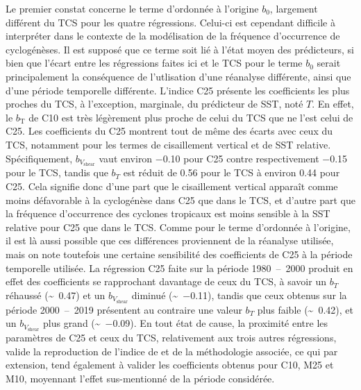 \documentclass[../main.tex]{subfiles}
\begin{document}
Le premier constat concerne le terme d'ordonnée à l'origine $b_0$, largement différent du TCS pour les quatre régressions. Celui-ci est cependant difficile à
interpréter dans le contexte de la modélisation de la fréquence d'occurrence de cyclogénèses. Il est supposé que ce terme soit lié à l'état moyen des
prédicteurs, si bien que l'écart entre les régressions faites ici et le TCS pour le terme $b_0$ serait principalement la conséquence de l'utlisation d'une
réanalyse différente, ainsi que d'une période temporelle différente. L'indice C25 présente les coefficients les plus proches du TCS, à l'exception, marginale,
du prédicteur de SST, noté $T$. En effet, le $b_{\mathrm{T}}$ de C10 est très légèrement plus proche de celui du TCS que ne l'est celui de C25. Les coefficients
du C25 montrent tout de même des écarts avec ceux du TCS, notamment pour les termes de cisaillement vertical et de SST relative. Spécifiquement,
$b_{V_{\mathrm{shear}}}$ vaut environ \num{-0.10} pour C25 contre respectivement \num{-0.15} pour le TCS, tandis que $b_T$ est réduit de \num{0.56} pour le TCS
à environ \num{0.44} pour C25. Cela signifie donc d'une part que le cisaillement vertical apparaît comme moins défavorable à la cyclogénèse dans C25 que dans
le TCS, et d'autre part que la fréquence d'occurrence des cyclones tropicaux est moins sensible à la SST relative pour C25 que dans le TCS. Comme pour le terme
d'ordonnée à l'origine, il est là aussi possible que ces différences proviennent de la réanalyse utilisée, mais on note toutefois une certaine sensibilité des
coefficients de C25 à la période temporelle utilisée. La régression C25 faite sur la période \num{1980}~--~\num{2000} produit en effet des coefficients se
rapprochant davantage de ceux du TCS, à savoir un $b_T$ réhaussé (\sim~\num{0.47}) et un $b_{V_{\mathrm{shear}}}$ diminué (\sim~\num{-0.11}), tandis que ceux
obtenus sur la période \num{2000}~--~\num{2019} présentent au contraire une valeur $b_T$ plus faible (\sim~\num{0.42}), et un $b_{V_{\mathrm{shear}}}$ plus
grand (\sim~\num{-0.09}). En tout état de cause, la proximité entre les paramètres de C25 et ceux du TCS, relativement aux trois autres régressions, valide la
reproduction de l'indice de \textcite{tippett_poisson_2011} et de la méthodologie associée, ce qui par extension, tend également à valider les coefficients
obtenus pour C10, M25 et M10, moyennant l'effet sus-mentionné de la période considérée.
\end{document}
